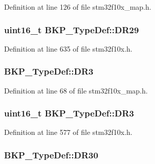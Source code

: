 Definition at line 126 of file stm32f10x\+\_\+map.\+h.

\subsubsection[{\texorpdfstring{D\+R29}{DR29}}]{ {\bf uint16\+\_\+t} B\+K\+P\+\_\+\+Type\+Def\+::\+D\+R29}\hypertarget{struct_b_k_p___type_def_a39b3d425209555dfe74c0b51c565115d}{}\label{struct_b_k_p___type_def_a39b3d425209555dfe74c0b51c565115d}


Definition at line 635 of file stm32f10x.\+h.

\subsubsection[{\texorpdfstring{D\+R3}{DR3}}]{ B\+K\+P\+\_\+\+Type\+Def\+::\+D\+R3}\hypertarget{struct_b_k_p___type_def_a1579dd5ba839e5f73fba0f31ff9cc8d7}{}\label{struct_b_k_p___type_def_a1579dd5ba839e5f73fba0f31ff9cc8d7}


Definition at line 68 of file stm32f10x\+\_\+map.\+h.

\subsubsection[{\texorpdfstring{D\+R3}{DR3}}]{ {\bf uint16\+\_\+t} B\+K\+P\+\_\+\+Type\+Def\+::\+D\+R3}\hypertarget{struct_b_k_p___type_def_a034cf532a9752513de879c0f4ff38d0a}{}\label{struct_b_k_p___type_def_a034cf532a9752513de879c0f4ff38d0a}


Definition at line 577 of file stm32f10x.\+h.

\subsubsection[{\texorpdfstring{D\+R30}{DR30}}]{ B\+K\+P\+\_\+\+Type\+Def\+::\+D\+R30}\hypertarget{struct_b_k_p___type_def_a433adf5aeebb8f71c6108213ab9e5150}{}\label{struct_b_k_p___type_def_a433adf5aeebb8f71c6108213ab9e5150}


